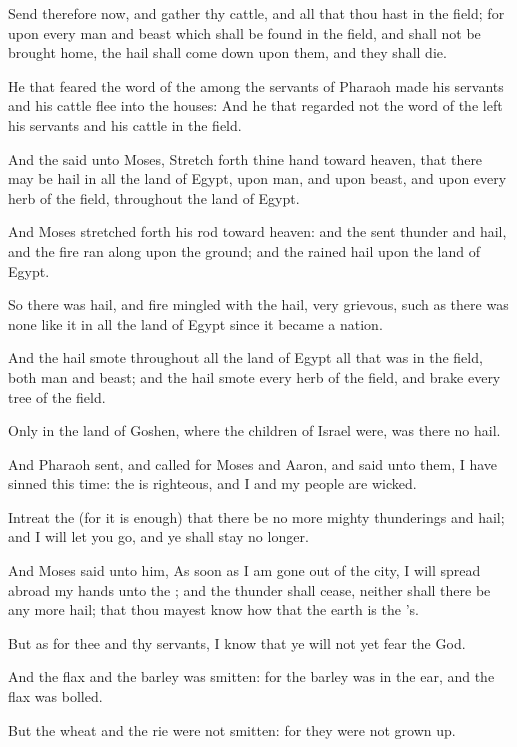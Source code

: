 \verse Send therefore now, and gather thy cattle, and all that thou hast in the field; for upon every man and beast which shall be found in the field, and shall not be brought home, the hail shall come down upon them, and they shall die.

\verse He that feared the word of the \LORD among the servants of Pharaoh made his servants and his cattle flee into the houses: \verse And he that regarded not the word of the \LORD left his servants and his cattle in the field.

\verse And the \LORD said unto Moses, Stretch forth thine hand toward heaven, that there may be hail in all the land of Egypt, upon man, and upon beast, and upon every herb of the field, throughout the land of Egypt.

\verse And Moses stretched forth his rod toward heaven: and the \LORD sent thunder and hail, and the fire ran along upon the ground; and the \LORD rained hail upon the land of Egypt.

\verse So there was hail, and fire mingled with the hail, very grievous, such as there was none like it in all the land of Egypt since it became a nation.

\verse And the hail smote throughout all the land of Egypt all that was in the field, both man and beast; and the hail smote every herb of the field, and brake every tree of the field.

\verse Only in the land of Goshen, where the children of Israel were, was there no hail.

\verse And Pharaoh sent, and called for Moses and Aaron, and said unto them, I have sinned this time: the \LORD is righteous, and I and my people are wicked.

\verse Intreat the \LORD (for it is enough) that there be no more mighty thunderings and hail; and I will let you go, and ye shall stay no longer.

\verse And Moses said unto him, As soon as I am gone out of the city, I will spread abroad my hands unto the \LORD; and the thunder shall cease, neither shall there be any more hail; that thou mayest know how that the earth is the \LORD's.

\verse But as for thee and thy servants, I know that ye will not yet fear the \LORD God.

\verse And the flax and the barley was smitten: for the barley was in the ear, and the flax was bolled.

\verse But the wheat and the rie were not smitten: for they were not grown up.

